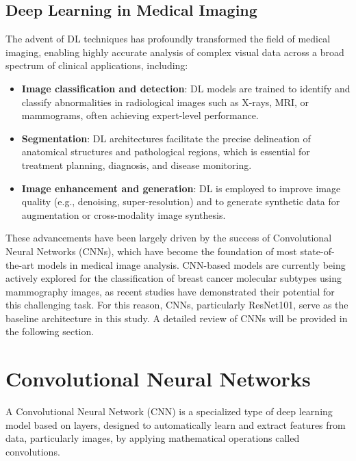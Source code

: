 \documentclass[a4paper,10pt]{book}
\begin{document}
\subsection{Deep Learning in Medical Imaging}

The advent of DL techniques has profoundly transformed the field of medical imaging, enabling highly accurate analysis of complex visual data across a broad spectrum of clinical applications, including:

\begin{itemize}
    \item \textbf{Image classification and detection}: DL models are trained to identify and classify abnormalities in radiological images such as X-rays, MRI, or mammograms, often achieving expert-level performance.
    \item \textbf{Segmentation}: DL architectures facilitate the precise delineation of anatomical structures and pathological regions, which is essential for treatment planning, diagnosis, and disease monitoring.
    \item \textbf{Image enhancement and generation}: DL is employed to improve image quality (e.g., denoising, super-resolution) and to generate synthetic data for augmentation or cross-modality image synthesis.
\end{itemize}

These advancements have been largely driven by the success of Convolutional Neural Networks (CNNs), which have become the foundation of most state-of-the-art models in medical image analysis. CNN-based models are currently being actively explored for the classification of breast cancer molecular subtypes using mammography images, as recent studies have demonstrated their potential for this challenging task\cite{mota_breast_2024, ben_rabah_multimodal_2025}. For this reason, CNNs, particularly ResNet101, serve as the baseline architecture in this study. A detailed review of CNNs will be provided in the following section.



\section{Convolutional Neural Networks}

A Convolutional Neural Network (CNN) is a specialized type of deep learning model based on layers, designed to automatically learn and extract features from data, particularly images, by applying mathematical operations called convolutions. 
\end{document}
